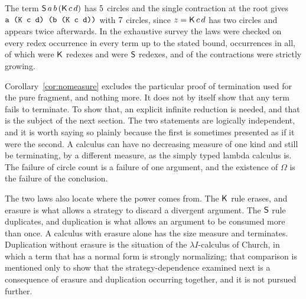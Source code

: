 \begin{example}
The term $\mathsf{S}\,a\,b\,(\mathsf{K}\,c\,d)$ has $5$ circles and the single contraction at the root gives $\texttt{a (K c d) (b (K c d))}$ with $7$ circles, since $z=\mathsf{K}\,c\,d$ has two circles and appears twice afterwards. In the exhaustive survey the laws were checked on every redex occurrence in every term up to the stated bound, \factRedexes{} occurrences in all, of which \factKRedexes{} were $\mathsf{K}$ redexes and \factSRedexes{} were $\mathsf{S}$ redexes, and \factGrowing{} of the contractions were strictly growing.
\end{example}

Corollary~\ref{cor:nomeasure} excludes the particular proof of termination used for the pure fragment, and nothing more. It does not by itself show that any term fails to terminate. To show that, an explicit infinite reduction is needed, and that is the subject of the next section. The two statements are logically independent, and it is worth saying so plainly because the first is sometimes presented as if it were the second. A calculus can have no decreasing measure of one kind and still be terminating, by a different measure, as the simply typed lambda calculus is. The failure of circle count is a failure of one argument, and the existence of $\Omega$ is the failure of the conclusion.

The two laws also locate where the power comes from. The $\mathsf{K}$ rule erases, and erasure is what allows a strategy to discard a divergent argument. The $\mathsf{S}$ rule duplicates, and duplication is what allows an argument to be consumed more than once. A calculus with erasure alone has the size measure and terminates. Duplication without erasure is the situation of the $\lambda I$-calculus of Church, in which a term that has a normal form is strongly normalizing; that comparison is mentioned only to show that the strategy-dependence examined next is a consequence of erasure and duplication occurring together, and it is not pursued further.
